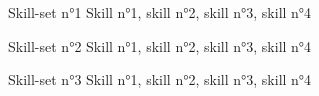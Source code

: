 


\begin{cvskills}


\cvskill
{Skill-set n°1} %
{Skill n°1, skill n°2, skill n°3, skill n°4} %


\cvskill
{Skill-set n°2} %
{Skill n°1, skill n°2, skill n°3, skill n°4} %


\cvskill
{Skill-set n°3} %
{Skill n°1, skill n°2, skill n°3, skill n°4} %




\end{cvskills}